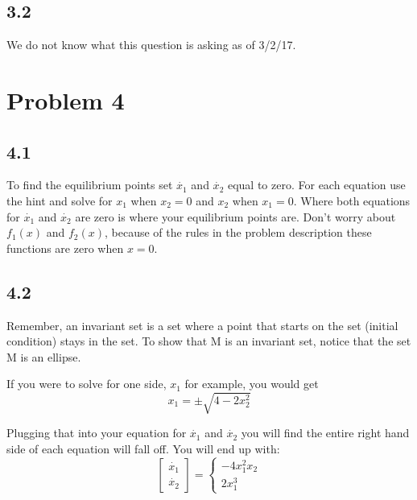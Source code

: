 \documentclass[12pt]{article}
\begin{document}
\subsection*{3.2}
We do not know what this question is asking as of 3/2/17.

\section*{Problem 4}
\subsection*{4.1}
To find the equilibrium points set $\dot{x_1}$ and $\dot{x_2}$ equal to zero. For each equation use the hint and solve for $x_1$ when $x_2=0$ and $x_2$ when $x_1=0$. Where both equations for $\dot{x_1}$ and $\dot{x_2}$ are zero is where your equilibrium points are. Don't worry about $f_1(x)$ and $f_2(x)$, because of the rules in the problem description these functions are zero when $x=0$.

\subsection*{4.2}
Remember, an invariant set is a set where a point that starts on the set (initial condition) stays in the set.
To show that M is an invariant set, notice that the set M is an ellipse. 


If you were to solve for one side, $x_1$ for example, you would get
$$x_1=\pm\sqrt{4-2x_2^2}$$

Plugging that into your equation for $\dot{x_1}$ and $\dot{x_2}$ you will find the entire right hand side of each equation will fall off. You will end up with:
$$\begin{bmatrix}\dot{x_1} \\ 
\dot{x_2}\end{bmatrix}=
\begin{cases}-4x_1^2x_2\\ 
2x_1^3
\end{cases}$$ 
\end{document}
